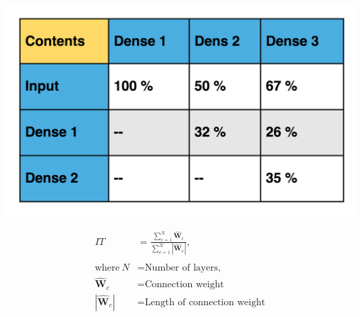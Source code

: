 \documentclass{article}
\let\oldhat\hat
\renewcommand{\hat}[1]{\oldhat{\mathbf{#1}}}
\begin{document}
\begin{minipage}{.45\textwidth}
    \centering
    \includegraphics[scale=0.13]{SampleTable.png}
    \label{fig:DSC.png}
\end{minipage}
\begin{minipage}{.45\textwidth}
    \begin{equation}
    \begin{aligned}
    IT &=\frac{\sum_{c=1}^{N}\hat{W}_{c}}{\sum_{c=1}^{N}|\hat{W}_{c}|}, \\
    \\
    \text{where}~N &= \text{Number of layers,} \\
    \hat{W}_{c} &= \text{Connection weight}\\
    |\hat{W}_{c}| &= \text{Length of connection weight}\\
\end{aligned}
\end{equation}
\end{minipage}
\end{document}
